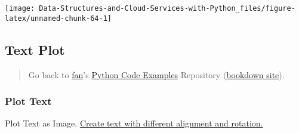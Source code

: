 \documentclass[
]{book}
\begin{document}
\begin{center}\texttt{[image: Data-Structures-and-Cloud-Services-with-Python\_files/figure-latex/unnamed-chunk-64-1]} \end{center}

\hypertarget{text-plot}{%
\subsection{Text Plot}\label{text-plot}}

\begin{quote}
Go back to \href{http://fanwangecon.github.io/}{fan}'s \href{https://fanwangecon.github.io/pyfan/}{Python Code Examples} Repository (\href{https://fanwangecon.github.io/pyfan/bookdown}{bookdown site}).
\end{quote}

\hypertarget{plot-text}{%
\subsubsection{Plot Text}\label{plot-text}}

Plot Text as Image. \href{https://matplotlib.org/3.1.1/gallery/pyplots/text_layout.html\#sphx-glr-gallery-pyplots-text-layout-py}{Create text with different alignment and rotation.}
\end{document}
